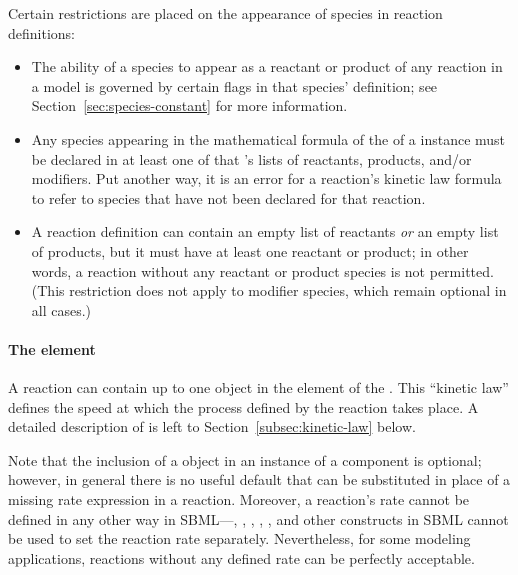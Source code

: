 Certain restrictions are placed on the appearance of species in
reaction definitions:
\begin{itemize}
  
\item The ability of a species to appear as a reactant or product
  of any reaction in a model is governed by certain flags in that
  species' definition; see Section~\ref{sec:species-constant} for
  more information.
  
\item Any species appearing in the mathematical formula of the
   of a \Reaction instance must be declared in
  at least one of that \Reaction's lists of reactants, products,
  and/or modifiers.  Put another way, it is an error for a
  reaction's kinetic law formula to refer to species that have not
  been declared for that reaction.
  
\item A reaction definition can contain an empty list of reactants
  \emph{or} an empty list of products, but it must have at least
  one reactant or product; in other words, a reaction without any
  reactant or product species is not permitted.  (This restriction
  does not apply to modifier species, which remain optional in all
  cases.)

\end{itemize}


\paragraph{The  element}

A reaction can contain up to one \KineticLaw object in the
 element of the \Reaction.  This ``kinetic law''
defines the speed at which the process defined by the reaction
takes place.  A detailed description of \KineticLaw is left to
Section~\ref{subsec:kinetic-law} below.

Note that the inclusion of a \KineticLaw object in an instance
of a \Reaction component is optional; however, in general there is
no useful default that can be substituted in place of a missing
rate expression in a reaction.  Moreover, a reaction's rate cannot
be defined in any other way in SBML---\InitialAssignment,
\AssignmentRule, \RateRule, \AlgebraicRule, \Event, and other
constructs in SBML cannot be used to set the reaction rate
separately.  Nevertheless, for some modeling applications,
reactions without any defined rate can be perfectly acceptable.


